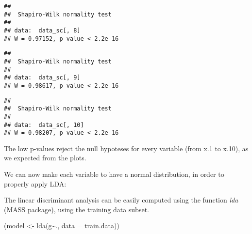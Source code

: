 \documentclass[
]{article}
\newenvironment{Shaded}{\begin{snugshade}}{\end{snugshade}}
\newcommand{\AttributeTok}[1]{\textcolor[rgb]{0.77,0.63,0.00}{#1}}
\newcommand{\FunctionTok}[1]{\textcolor[rgb]{0.00,0.00,0.00}{#1}}
\newcommand{\NormalTok}[1]{#1}
\newcommand{\OtherTok}[1]{\textcolor[rgb]{0.56,0.35,0.01}{#1}}
\newcommand{\SpecialCharTok}[1]{\textcolor[rgb]{0.00,0.00,0.00}{#1}}
\begin{document}
\begin{verbatim}
## 
##  Shapiro-Wilk normality test
## 
## data:  data_sc[, 8]
## W = 0.97152, p-value < 2.2e-16
\end{verbatim}

\begin{verbatim}
## 
##  Shapiro-Wilk normality test
## 
## data:  data_sc[, 9]
## W = 0.98617, p-value < 2.2e-16
\end{verbatim}

\begin{verbatim}
## 
##  Shapiro-Wilk normality test
## 
## data:  data_sc[, 10]
## W = 0.98207, p-value < 2.2e-16
\end{verbatim}

The low p-values reject the null hypoteses for every variable (from x.1
to x.10), as we expected from the plots.

We can now make each variable to have a normal distribution, in order to
properly apply LDA:

The linear discriminant analysis can be easily computed using the
function \emph{lda} (MASS package), using the training data subset.

\begin{Shaded}
\begin{Highlighting}[]
\NormalTok{(model }\OtherTok{\textless{}{-}} \FunctionTok{lda}\NormalTok{(g}\SpecialCharTok{\textasciitilde{}}\NormalTok{., }\AttributeTok{data =}\NormalTok{ train.data))}
\end{Highlighting}
\end{Shaded}
\end{document}
